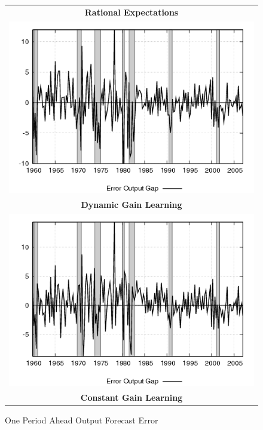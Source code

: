 \begin{figure}[ht]
\caption{One Period Ahead Output Forecast Error}\label{fg3:outputerr}
\begin{center}
\begin{tabular}{c}
\textbf{Rational Expectations} \\  
\includegraphics[scale=0.5]{results_re/output_err.png} \\
\textbf{Dynamic Gain Learning} \\
\includegraphics[scale=0.5]{results_dg8_wlsinit/output_err.png} \\
\textbf{Constant Gain Learning} \\

\end{tabular}
\end{center}
\end{figure}
